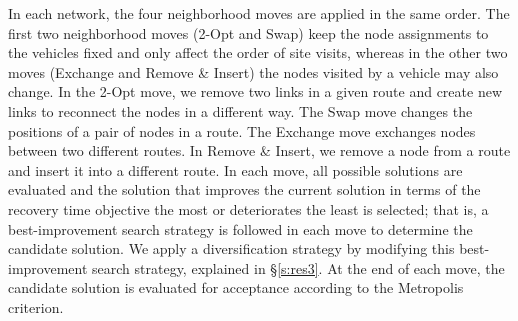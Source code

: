 \documentclass[11pt]{article}
\begin{document}
In each network, the four neighborhood moves are applied in the same order. The first two neighborhood moves (2-Opt and Swap) keep the node assignments to the vehicles fixed and only affect the order of site visits, whereas in the other two moves (Exchange and Remove \& Insert) the nodes visited by a vehicle may also change. In the 2-Opt move, we remove two links in a given route and create new links to reconnect the nodes in a different way. The Swap move changes the positions of a pair of nodes in a route. The Exchange move exchanges nodes between two different routes. In Remove \& Insert, we remove a node from a route and insert it into a different route. In each move, all possible solutions are evaluated and the solution that improves the current solution in terms of the recovery time objective the most or deteriorates the least is selected; that is, a best-improvement search strategy is followed in each move to determine the candidate solution. We apply a diversification strategy by modifying this best-improvement search strategy, explained in \S \ref{s:res3}. At the end of each move, the candidate solution is evaluated for acceptance according to the Metropolis criterion. 






\end{document}
